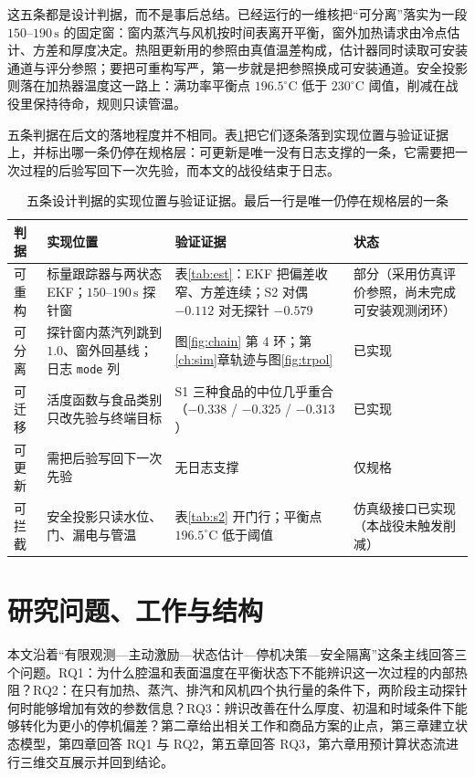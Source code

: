 这五条都是设计判据，而不是事后总结。已经运行的一维核把“可分离”落实为一段 \(150\)--\(190\,\mathrm{s}\) 的固定窗：窗内蒸汽与风机按时间表离开平衡，窗外加热请求由冷点估计、方差和厚度决定。热阻更新用的参照由真值温差构成，估计器同时读取可安装通道与评分参照；要把可重构写严，第一步就是把参照换成可安装通道。安全投影则落在加热器温度这一路上：满功率平衡点 \(196.5^\circ\mathrm{C}\) 低于 \(230^\circ\mathrm{C}\) 阈值，削减在战役里保持待命，规则只读管温。

五条判据在后文的落地程度并不相同。表\ref{tab:properties}{}把它们逐条落到实现位置与验证证据上，并标出哪一条仍停在规格层：可更新是唯一没有日志支撑的一条，它需要把一次过程的后验写回下一次先验，而本文的战役结束于日志。

\begin{table}[t]
\centering
\caption{五条设计判据的实现位置与验证证据。最后一行是唯一仍停在规格层的一条}
\label{tab:properties}
\begin{tabularx}{\textwidth}{l>{\raggedright\arraybackslash}p{3.6cm}>{\raggedright\arraybackslash}p{3.6cm}>{\raggedright\arraybackslash}p{3.2cm}}
\toprule
判据 & 实现位置 & 验证证据 & 状态 \\
\midrule
可重构 & 标量跟踪器与两状态 EKF；\(150\)--\(190\,\mathrm{s}\) 探针窗 & 表\ref{tab:est}：EKF 把偏差收窄、方差连续；S2 对偶 \(-0.112\) 对无探针 \(-0.579\) & 部分（采用仿真评价参照，尚未完成可安装观测闭环） \\
可分离 & 探针窗内蒸汽列跳到 \(1.0\)、窗外回基线；日志 \texttt{mode} 列 & 图\ref{fig:chain} 第 4 环；第\ref{ch:sim}{}章轨迹与图\ref{fig:trpol} & 已实现 \\
可迁移 & 活度函数与食品类别只改先验与终端目标 & S1 三种食品的中位几乎重合（\(-0.338\) / \(-0.325\) / \(-0.313\)） & 已实现 \\
可更新 & 需把后验写回下一次先验 & 无日志支撑 & 仅规格 \\
可拦截 & 安全投影只读水位、门、漏电与管温 & 表\ref{tab:s2} 开门行；平衡点 \(196.5^\circ\mathrm{C}\) 低于阈值 & 仿真级接口已实现（本战役未触发削减） \\
\bottomrule
\end{tabularx}
\end{table}

\section{研究问题、工作与结构}

本文沿着“有限观测—主动激励—状态估计—停机决策—安全隔离”这条主线回答三个问题。RQ1：为什么腔温和表面温度在平衡状态下不能辨识这一次过程的内部热阻？RQ2：在只有加热、蒸汽、排汽和风机四个执行量的条件下，两阶段主动探针何时能够增加有效的参数信息？RQ3：辨识改善在什么厚度、初温和时域条件下能够转化为更小的停机偏差？第二章给出相关工作和商品方案的止点，第三章建立状态模型，第四章回答 RQ1 与 RQ2，第五章回答 RQ3，第六章用预计算状态流进行三维交互展示并回到结论。

